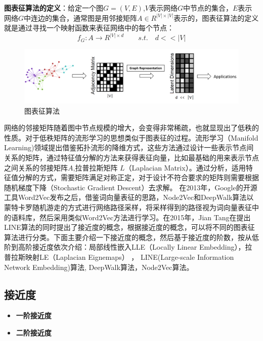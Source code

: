 \textbf{图表征算法的定义}：给定一个图$G = (V,E)$,$V$表示网络$G$中节点的集合，$E$表示网络$G$中连边的集合，通常图是用邻接矩阵$A \in R^{|V|\times|V|}$表示的，图表征算法的定义就是通过寻找一个映射函数来表征网络中的每个节点：
\begin{equation}
f_G: A \rightarrow R^{|V| \times d} \qquad s.t.\quad d<<|V|
\end{equation}

\begin{figure}
	\centering
	\includegraphics[width=5.5in]{figures/network_embedding}
	\caption{图表征算法}
\end{figure}


网络的邻接矩阵随着图中节点规模的增大，会变得非常稀疏，也就显现出了低秩的性质。对于低秩矩阵的流形学习的思想类似于图表征的过程。流形学习（Manifold Learning)领域提出借鉴拓扑流形的降维方式，这些方法通过设计一些表示节点间关系的矩阵，通过特征值分解的方法来获得表征向量，比如最基础的用来表示节点之间关系的邻接矩阵$A$,拉普拉斯矩阵 $L$（Laplacian Matrix）。通过分析，适用特征值分解的方式，需要矩阵满足对称正定，对于设计不符合要求的矩阵则需要根据随机梯度下降（Stochastic Gradient Descent）去求解。
在2013年，Google的开源工具Word2Vec\cite{mikolov2013efficient}发布之后，借鉴词向量表征的思路，Node2Vec和DeepWalk算法以蒙特卡罗随机游走的方式进行网络路径采样，将采样得到的路径视为词向量表征中的语料库，然后采用类似Word2Vec方法进行学习。在2015年，Jian Tang\cite{tang2015line}在提出LINE算法的同时提出了接近度的概念，根据接近度的概念，可以将不同的图表征算法进行分类。下面主要介绍一下接近度的概念，然后基于接近度的阶数，按从低阶到高阶接近度依次介绍：局部线性嵌入LLE（Locally Linear Embedding），拉普拉斯映射LE（Laplacian Eignemaps） ， LINE(Large-scale Information Network Embedding)算法, DeepWalk算法，Node2Vec算法。
\subsection{接近度}
\begin{itemize}
	\item \textbf{一阶接近度}
	\item \textbf{二阶接近度}
\end{itemize}




